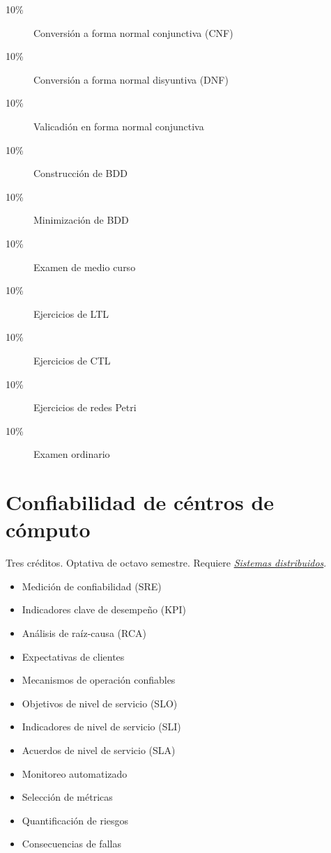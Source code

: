 \documentclass{article}
\begin{document}
\begin{multicols}{4}
\begin{description}
\item[10\%]{Conversi\'{o}n a forma normal conjunctiva (CNF)}
\item[10\%]{Conversi\'{o}n a forma normal disyuntiva (DNF)}
\item[10\%]{Valicadi\'{o}n en forma normal conjunctiva}
\item[10\%]{Construcci\'{o}n de BDD}
\item[10\%]{Minimizaci\'{o}n de BDD}  

\item[10\%]{Examen de medio curso}  
\item[10\%]{Ejercicios de LTL}
\item[10\%]{Ejercicios de CTL}
\item[10\%]{Ejercicios de redes Petri}    
\item[10\%]{Examen ordinario}
\end{description}  

\newpage

\hypertarget{cdc}{\section*{Confiabilidad de c\'{e}ntros de c\'{o}mputo}} 

Tres cr\'{e}ditos. Optativa de octavo semestre. Requiere
\hyperlink{sdi}{\em Sistemas distribuidos}.

\begin{itemize}
\item{Medici\'{o}n de confiabilidad (SRE)}
\item{Indicadores clave de desempe\~{n}o (KPI)}
\item{An\'{a}lisis de ra\'{i}z-causa (RCA)}
\item{Expectativas de clientes}
\item{Mecanismos de operaci\'{o}n confiables}
\item{Objetivos de nivel de servicio (SLO)}
\item{Indicadores de nivel de servicio (SLI)}
\item{Acuerdos de nivel de servicio (SLA)}
\item{Monitoreo automatizado}
\item{Selecci\'{o}n de m\'{e}tricas}
\item{Quantificaci\'{o}n de riesgos}
\item{Consecuencias de fallas}
\end{itemize}


\end{multicols}
\end{document}
